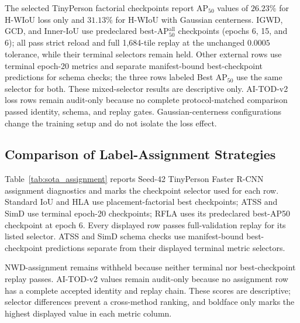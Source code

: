 \documentclass[11pt,a4paper]{article}
\begin{document}
The selected TinyPerson factorial checkpoints report AP$_{50}$ values of $26.23\%$ for H-WIoU loss only and $31.13\%$ for H-WIoU with Gaussian centerness. IGWD, GCD, and Inner-IoU use predeclared best-AP$_{50}^{\mathrm{all}}$ checkpoints (epochs 6, 15, and 6); all pass strict reload and full 1,684-tile replay at the unchanged $0.0005$ tolerance, while their terminal selectors remain held. Other external rows use terminal epoch-20 metrics and separate manifest-bound best-checkpoint predictions for schema checks; the three rows labeled Best AP$_{50}$ use the same selector for both. These mixed-selector results are descriptive only. AI-TOD-v2 loss rows remain audit-only because no complete protocol-matched comparison passed identity, schema, and replay gates. Gaussian-centerness configurations change the training setup and do not isolate the loss effect.

\subsection{Comparison of Label-Assignment Strategies}
\label{sec:sota_assignment}

Table~\ref{tab:sota_assignment} reports Seed-42 TinyPerson Faster R-CNN assignment diagnostics and marks the checkpoint selector used for each row. Standard IoU and HLA use placement-factorial best checkpoints; ATSS and SimD use terminal epoch-20 checkpoints; RFLA uses its predeclared best-AP50 checkpoint at epoch 6. Every displayed row passes full-validation replay for its listed selector. ATSS and SimD schema checks use manifest-bound best-checkpoint predictions separate from their displayed terminal metric selectors.

NWD-assignment remains withheld because neither terminal nor best-checkpoint replay passes. AI-TOD-v2 values remain audit-only because no assignment row has a complete accepted identity and replay chain. These scores are descriptive; selector differences prevent a cross-method ranking, and boldface only marks the highest displayed value in each metric column.
\end{document}
